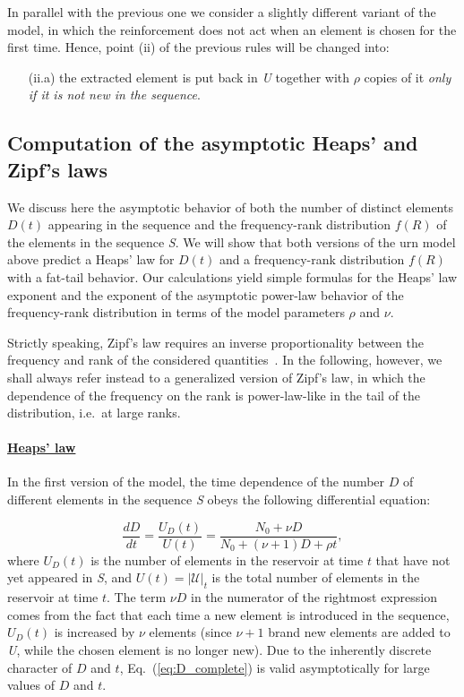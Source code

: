 \documentclass[graybox]{svmult}
\begin{document}
In parallel with the previous one we consider a slightly different variant of the model, in which the reinforcement does not act when an element is chosen for the first time.  Hence, point (ii) of the previous rules will be changed into:
%
\begin{enumerate}
\item[(ii.a)] 
	the extracted element is put back in {\em U} together with $\rho$ copies of it \emph{only if it is  not new in the sequence}.
\end{enumerate}

\subsection{Computation of the asymptotic Heaps' and Zipf's laws}

We discuss here the asymptotic behavior of both the number of distinct elements $D(t)$ appearing in the sequence  and the
frequency-rank distribution $f(R)$ of the elements in the sequence {\em S}.  We will show that both versions of the urn model above predict a Heaps' law for $D(t)$ and a frequency-rank distribution $f(R)$ with a fat-tail behavior. Our calculations yield simple formulas for the Heaps' law exponent and the exponent of the asymptotic power-law behavior of the frequency-rank distribution  in terms of  the model parameters $\rho$ and $\nu$. 

Strictly speaking, Zipf's law requires an inverse proportionality between the frequency and rank of the considered quantities~\cite{zipf_1949}. In the following, however, we shall always refer instead to a generalized version of Zipf's law, in which the dependence of the frequency on the rank is  power-law-like in the tail of the distribution, i.e.\ at large ranks. 

\paragraph{\underline{Heaps' law}}
%
In the first version of the model, the time dependence  of the number  $D$  of different elements in the sequence {\em S} obeys the following differential equation: 
 
\begin{equation}
  \frac{d D}{dt}= \frac{U_D(t)}{U(t)}=\frac{N_0 + \nu D}{N_0+(\nu+1) D+\rho t},\label{eq:D_complete}
\end{equation}
%
 where $U_D(t)$ is the number of  elements in the reservoir at time $t$ that have not yet appeared in {\em S}, and $U(t)=|\mathcal{U}|_t$ is the total number of elements in the reservoir at time $t$. The term $\nu D$ in the numerator of the rightmost expression comes from the fact that each time a new element is introduced in the sequence,  $U_D(t)$ is increased by  $\nu$  elements (since $\nu+1$ brand new elements   are added to {\em U}, while the chosen element is no longer new). Due to the inherently discrete character of $D$ and $t$, Eq.~(\ref{eq:D_complete}) is valid asymptotically for large values of $D$ and $t$.
\end{document}
